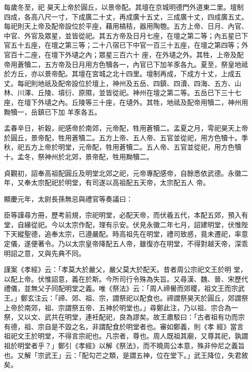 \begin{pinyinscope}
 每歲冬至，祀
 昊天上帝於圓丘，以景帝配。其壇在京城明德門外道東二里。壇制四成，各高八尺一寸，下成廣二十丈，再成廣十五丈，三成廣十丈，四成廣五丈。每祀則天上帝及配帝設位於平座，藉用槁秸，器用陶匏。五方上帝、日月、內官、中官、外官及眾星，並皆從祀。其五方帝及日月七座，在壇之第二等；內五星已下官五十五座，在壇之第三等；二十八宿已下中官一百三十五座，在壇之第四等；外官百十二座，在壇下外壝之內；眾星三百六十
 座，在外壝之外。其牲，上帝及配帝用蒼犢二，五方帝及日月用方色犢各一，內官已下加羊豕各九。夏至，祭皇地祗於方丘，亦以景帝配。其壇在宮城之北十四里。壇制再成，下成方十丈，上成五丈。每祀則地祇及配帝設位於壇上，神州及五岳、四鎮、四瀆、四海、五方、山林、川澤、丘陵、墳衍、原隰，並皆從祀。神州在壇之第二等。五岳已下三十七座，在壇下外壝之內。丘陵等三十座，在壝外。其牲，地祗及配帝用犢二，神州用黝犢一，岳鎮已下加
 羊豕各五。



 孟春辛日，祈穀，祀感帝於南郊，元帝配，牲用蒼犢二。孟夏之月，雩祀昊天上帝於圓丘，景帝配，牲用蒼犢二。五方上帝、五人帝、五官並從祀，用方色犢十。季秋，祀五方上帝於明堂，元帝配，牲用蒼犢二。五人帝、五官並從祀，用方色犢十。孟冬，祭神州於北郊，景帝配，牲用黝犢二。



 貞觀初，詔奉高祖配圓丘及明堂北郊之祀，元帝專配感帝，自餘悉依武德。永徽二年，又奉太宗配祀於明堂，有司遂以高祖配五天帝，太宗配五人
 帝。



 顯慶元年，太尉長孫無忌與禮官等奏議曰：



 臣等謹尋方冊，歷考前規，宗祀明堂，必配天帝，而伏羲五代，本配五郊，預入有堂，自緣從祀。今以太宗作配，理有示安。伏見永徽二年七月，詔建明堂，伏惟陛下天縱聖德，追奉太宗，已遵嚴配。時高祖先在明堂，禮司致惑，竟未遷祀，率意定儀，遂便著令。乃以太宗皇帝降配五人帝，雖復亦在明堂，不得對越天帝，深乖明詔之意，又與先典不同。



 謹案《孝經》云：「孝莫大於嚴父，嚴父莫大於配天。昔者周公宗祀文王於明
 堂，以配上帝。伏惟詔意，義在於斯。今所司行令殊為失旨。又尋漢、魏、晉、宋歷代禮儀，並無父子同配明堂之義。唯《祭法》云：「周人禘嚳而郊稷，祖文王而宗武王。」鄭玄注云：「禘、郊、祖、宗，謂祭祀以配食也。禘謂祭昊天於圓丘，郊謂祭上帝於南郊，祖、宗謂祭五帝、五神於明堂也。」尋鄭此注，乃以祖、宗合為一祭，又以文、武共在明堂，連衽配祀，良為謬矣。故王肅駁曰：「古者祖有功而宗有德，祖、宗自是不毀之名，非謂配食於明堂者也。審如鄭義，則《孝
 經》當言祖祀文王於明堂，不得言宗祀也。凡宗者，尊也。周人既祖其廟，又尊其祀，孰謂祖於明堂者乎？」鄭引《孝經》以解《祭法》，而不曉周公本意，殊非仲尼之義旨也。又解「宗武王」云：「配勾芒之類，是謂五神，位在堂下。」武王降位，失君敘矣。




\end{pinyinscope}
